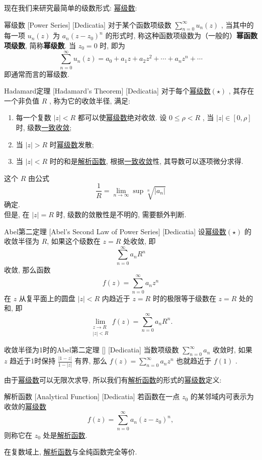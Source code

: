 \documentclass[UTF8]{ctexart}
\newcommand{\AnalyticalFunction}{\hyperref[dfn:AnalyticalFunction]{解析函数}}
\newcommand{\PowerSeries}{\hyperref[dfn:PowerSeries]{幂级数}}
\newcommand{\UniformConvergence}{\hyperref[dfn:UniformConvergence]{一致收敛}}
\begin{document}
现在我们来研究最简单的级数形式: \PowerSeries : 
\begin{dfn}
    [PowerSeries]
    {幂级数}
    [Power Series]
    [Dedicatia]
    对于某个函数项级数 \( \sum_{n = 0}^{\infty} u_n(z)  \) , 当其中的每一项 \( u_n(z) \) 为 \( a_n(z-z_0)^n \) 的形式时, 称这种函数项级数为（一般的）\textbf{幂函数项级数}, 简称\textbf{幂级数}. 当 \( z_0=0 \) 时, 即为
    \[\sum_{n = 0}^{\infty} u_n(z)=a_0+a_1z+a_2z^2+\cdots+a_nz^n+\cdots \tag{ \( \star \) }\]
    即通常而言的幂级数. 
\end{dfn}
\begin{thm}
    [UUID]
    {Hadamard定理}
    [Hadamard's Theorem]
    [Dedicatia]
    对于每个\PowerSeries  \( (\star) \) , 其存在一个非负值 \( R \) , 称为它的收敛半径, 满足: 
    \begin{enumerate}
        \item 每一个复数 \( |z|<R \) 都可以使\PowerSeries 绝对收敛. 设 \( 0\leqslant\rho <R \) , 当 \( |z|\in[0,\rho] \) 时, 级数\UniformConvergence ; 
        \item 当 \( |z|>R \) 时\PowerSeries 发散; 
        \item 当 \( |z|<R \) 时的和是\AnalyticalFunction , 根据\UniformConvergence 性, 其导数可以逐项微分求得. 
    \end{enumerate}
    这个 \( R \) 由公式
    \[\frac{1}{R}=\lim_{n\to \infty}\sup\sqrt[n]{|a_n|}\]
    确定. \\
    但是, 在 \( |z|=R \) 时, 级数的敛散性是不明的, 需要额外判断. 
\end{thm}
\begin{thm}
    [UUID]
    {Abel第二定理}
    [Abel's Second Law of Power Series]
    [Dedicatia]
    设\PowerSeries  \( (\star) \) 的收敛半径为 \( R \), 如果这个级数在 \( z = R \) 处收敛, 即
    \[\sum_{n=0}^{\infty} a_n R^n\]
    收敛, 那么函数
    \[f(z) = \sum_{n=0}^{\infty} a_n z^n\]
    在 \( z \) 从复平面上的圆盘 \( |z| < R \) 内趋近于 \( z = R \) 时的极限等于级数在 \( z = R \) 处的和, 即
    \[\lim_{\substack{z \to R \\ |z| < R}} f(z) = \sum_{n=0}^{\infty} a_n R^n.\]
\end{thm}
\begin{xmp}
    [UUID]
    {收敛半径为1时的Abel第二定理}
    []
    [Dedicatia]
    当数项级数 \( \sum\limits_{n=0}^\infty a_n \) 收敛时, 如果 \( z \) 趋近于1时保持 \( \frac{|1-z|}{1-|z|} \) 有界, 那么 \( f(z)=\sum\limits_{n=0}^\infty a_nz^n \) 也就趋近于 \( f(1) \) .
\end{xmp}
由于\PowerSeries 可以无限次求导, 所以我们有\AnalyticalFunction 的形式的\PowerSeries 定义: 
\begin{dfn}
    [UUID]
    {解析函数}
    [Analytical Function]
    [Dedicatia]
    若函数在一点 \(z_0\) 的某邻域内可表示为收敛的\PowerSeries   
    \[f(z)=\sum_{n=0}^{\infty}a_n(z-z_0)^n,\]  
    则称它在 \(z_0\) 处是\AnalyticalFunction .   
\end{dfn}
在复数域上, \AnalyticalFunction 与全纯函数完全等价. 
\end{document}
